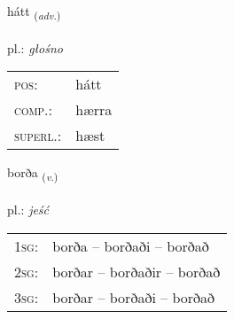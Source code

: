 \documentclass[frontgrid, backgrid]{flacards}\usepackage[]{graphicx}\usepackage[]{xcolor}
\begin{document}
\renewcommand{\flhead}{\vskip5pt \fboxsep=0pt {\small\bfseries\footnotesize Atviksorð | Adverb}}
\renewcommand{\fcfoot}{\vskip5pt \fboxsep=0pt \hspace{2pt}{\small\bfseries\footnotesize 1K}}

\renewcommand{\blhead}{\vskip5pt {\small\bfseries\footnotesize Atviksorð | Adverb }}
\renewcommand{\bcfoot}{\vskip5pt \hspace{2pt}{\small\bfseries\footnotesize 1K}}


{hátt \small{\textsubscript{(\textit{adv.})}} \\[1ex] %
\textphonetic{[hauht]} \\
pl.: \emph{głośno} \\  [2ex]
\renewcommand*{\arraystretch}{0.8}
\begin{tabular}{ll}
\textsc{pos}: & hátt \\ 
\textsc{comp.}: & hærra \\ 
\textsc{superl.}: & hæst \\
\end{tabular}
}

\renewcommand{\flhead}{\vskip5pt \fboxsep=0pt {\small\bfseries\footnotesize Sagnorð | Verb}}
\renewcommand{\fcfoot}{\vskip5pt \fboxsep=0pt \hspace{2pt}{\small\bfseries\footnotesize 1K}}

\renewcommand{\blhead}{\vskip5pt {\small\bfseries\footnotesize Sagnorð | Verb }}
\renewcommand{\bcfoot}{\vskip5pt \hspace{2pt}{\small\bfseries\footnotesize 1K}}


{borða \small{\textsubscript{(\textit{v.})}} \\[1ex] %
\textphonetic{[pɔrða]} \\
pl.: \emph{jeść} \\  [2ex]
\renewcommand*{\arraystretch}{0.8}
\begin{tabular}{p{1cm}l}
\textsc{1sg}: & borða -- borðaði -- borðað \\ 
\textsc{2sg}: & borðar -- borðaðir -- borðað \\ 
\textsc{3sg}: & borðar -- borðaði -- borðað \\ 
\end{tabular}
}
\end{document}
